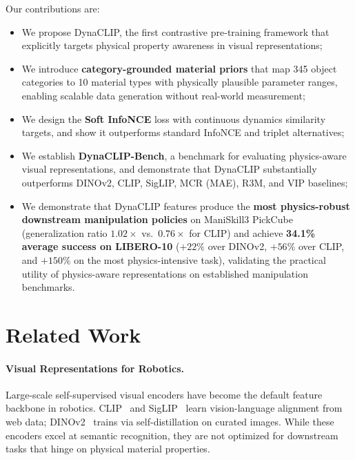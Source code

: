 \documentclass{article}
\newcommand{\methodname}{DynaCLIP}
\begin{document}
Our contributions are:
\begin{itemize}
    \item We propose \methodname{}, the first contrastive pre-training framework that explicitly targets physical property awareness in visual representations;
    \item We introduce \textbf{category-grounded material priors} that map 345 object categories to 10 material types with physically plausible parameter ranges, enabling scalable data generation without real-world measurement;
    \item We design the \textbf{Soft InfoNCE} loss with continuous dynamics similarity targets, and show it outperforms standard InfoNCE and triplet alternatives;
    \item We establish \textbf{DynaCLIP-Bench}, a benchmark for evaluating physics-aware visual representations, and demonstrate that \methodname{} substantially outperforms DINOv2, CLIP, SigLIP, MCR (MAE), R3M, and VIP baselines;
    \item We demonstrate that \methodname{} features produce the \textbf{most physics-robust downstream manipulation policies} on ManiSkill3 PickCube (generalization ratio $1.02\times$ vs.\ $0.76\times$ for CLIP) and achieve \textbf{34.1\% average success on LIBERO-10} ($+22\%$ over DINOv2, $+56\%$ over CLIP, and $+150\%$ on the most physics-intensive task), validating the practical utility of physics-aware representations on established manipulation benchmarks.
\end{itemize}%
\section{Related Work}
\label{sec:related}

\paragraph{Visual Representations for Robotics.}
Large-scale self-supervised visual encoders have become the default feature backbone in robotics. CLIP~\cite{radford2021clip} and SigLIP~\cite{zhai2023siglip} learn vision-language alignment from web data; DINOv2~\cite{oquab2024dinov2} trains via self-distillation on curated images. While these encoders excel at semantic recognition, they are not optimized for downstream tasks that hinge on physical material properties.
\end{document}

